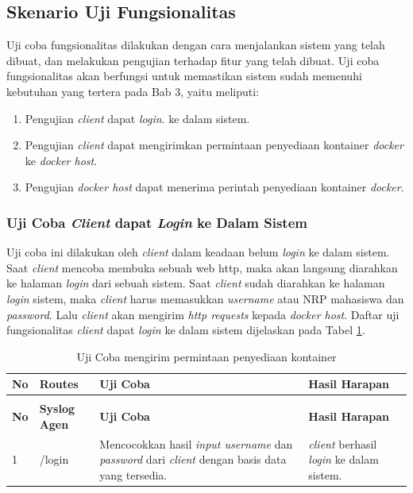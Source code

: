       \subsection{Skenario Uji Fungsionalitas}
      Uji coba fungsionalitas dilakukan dengan cara menjalankan sistem yang telah dibuat, dan melakukan pengujian terhadap fitur yang telah dibuat. Uji coba fungsionalitas akan berfungsi untuk memastikan sistem sudah memenuhi kebutuhan yang tertera pada Bab 3, yaitu meliputi:
   \begin{enumerate}
      \item Pengujian \textit{client} dapat \textit{login}. ke dalam sistem.
      \item Pengujian \textit{client} dapat mengirimkan permintaan penyediaan kontainer \textit{docker} ke \textit{docker host}.
      \item Pengujian \textit{docker host} dapat menerima perintah penyediaan kontainer \textit{docker}.
      \end{enumerate}
      
\subsubsection{Uji Coba \textit{Client} dapat \textit{Login} ke Dalam Sistem}
Uji coba ini dilakukan oleh \textit{client} dalam keadaan belum \textit{login} ke dalam sistem. Saat \textit{client} mencoba membuka sebuah web http, maka akan langsung diarahkan ke halaman \textit{login} dari sebuah sistem. Saat \textit{client} sudah diarahkan ke halaman \textit{login} sistem, maka \textit{client} harus memasukkan \textit{username} atau NRP mahasiswa dan \textit{password}. Lalu \textit{client} akan mengirim \textit{http requests} kepada \textit{docker host}. Daftar uji fungsionalitas \textit{client} dapat \textit{login} ke dalam sistem dijelaskan pada Tabel \ref{ujicoba1}.

\begin{longtable}{|p{}|p{}|p{}|p{}|} %
	
\caption{Skenario Uji Coba User dapat \textit{Login} ke Dalam Sistem} \label{ujicoba1} \\
\hline
\textbf{No} & \textbf{Routes} & \textbf{Uji Coba} & \textbf{Hasil Harapan} \\ \hline
\endfirsthead
\caption[]{Uji Coba mengirim permintaan penyediaan kontainer}  \\
\hline
\textbf{No} & \textbf{Syslog Agen} & \textbf{Uji Coba} & \textbf{Hasil Harapan} \\ \hline
\endhead
\endfoot
\endlastfoot
1 & /login & Mencocokkan hasil \textit{input username} dan \textit{password} dari \textit{client} dengan basis data yang tersedia. & \textit{client} berhasil \textit{login} ke dalam sistem. \\ \hline
\end{longtable}

